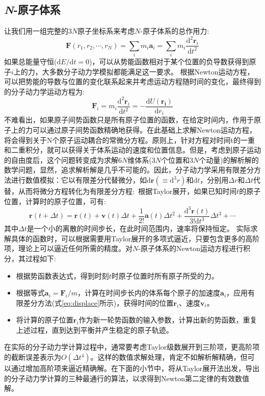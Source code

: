 \subsection{{\it N}-原子体系}
让我们用一组完整的$3N$原子坐标系来考虑$N$-原子体系的总作用力:
\begin{equation}
	\mathbf{F}(r_1,r_2,\cdots,r_N)=\sum_im_i\mathbf{a}_i=\sum_im_i\dfrac{\mathrm{d}^2\mathbf{r}_i}{\mathrm{d}t^2}
	\label{eq:MD_force}
\end{equation}
如果总能量守恒($\mathrm{d}E/\mathrm{d}t=0$)，可以从势能函数相对于某个位置的负导数获得到原子$i$上的力，大多数分子动力学模拟都能满足这一要求。%
根据\textrm{Newton}运动方程，可以把势能的导数与位置的变化联系起来并考虑运动方程随时间的变化，最终得到的分子动力学运动方程为:
\begin{equation}
	\mathbf{F}_i=m_i\dfrac{\mathrm{d}^2\mathbf{r}_i}{\mathrm{d}t^2}=-\dfrac{\mathrm{d}U(\mathbf{r_i})}{\mathrm{d}r_i}
	\label{eq:Forece_Potential}
\end{equation}
不难看出，如果原子间势函数只是所有原子位置的函数，在给定时间内，作用于原子上的力可以通过原子间势函数精确地获得。在此基础上求解\textrm{Newton}运动方程，将会得到关于N个原子运动耦合的常微分方程。原则上，针对方程对时间t的一重和二重积分，就可以获得关于体系运动的速度和位置信息。但是，考虑到原子运动的自由度后，这个问题转变成为求解$6N$维体系($3N$个位置和$3N$个动量)的解析解的数学问题，显然，追求解析解是几乎不可能的。因此，分子动力学采用有限差分方法进行数值模拟：它以有限差分代替微分，如$\mathrm{d}\mathbf{r}(\equiv\mathrm{d}^3r)$和$\mathrm{d}t$，分别用$\Delta r$和$\Delta t$代替，从而将微分方程转化为有限差分方程:~根据\textrm{Taylor}展开，如果已知时间$t$的原子位置，计算时的原子位置，可有:
\begin{equation}
	\mathbf{r}(t+\Delta t)=\mathbf{r}(t)+\mathbf{v}(t)\Delta t+\dfrac1{2!}\mathbf{a}(t)\Delta t^2+\dfrac{\mathrm{d}^3\mathbf{r}(t)}{3!\mathrm{d}t^3}\Delta t^3+\cdots
	\label{eq:displace}
\end{equation}
其中$\Delta t$是一个小的离散的时间步长，在此时间范围内，速率将保持恒定。
实际求解具体的函数时，可以根据需要用\textrm{Taylor}展开的多项式逼近，只要包含更多的高阶项，理论上可以逼近任何所需的精度。对$N$-原子体系的\textrm{Newton}运动方程进行积分，其过程如下:
\begin{itemize}
	\item 根据势函数表达式，得到时刻$t$时原子位置时所有原子所受的力。
	\item 根据等式$\mathbf{a}_i =\mathbf{F}_i/m$，计算在时间步长内的体系每个原子的加速度$\mathbf{a}_i$，应用有限差分方法(式\eqref{eq:displace}所示)，获得时间的位置$\mathbf{r}_i$、速度$\mathbf{v}_i$。
	\item 将计算的原子位置$\mathbf{r}_i$作为新一轮势函数的输入参数，计算出新的势函数，重复上述过程，直到达到平衡并产生稳定的原子轨迹。
\end{itemize}
在实际的分子动力学计算过程中，通常要考虑\textrm{Taylor}级数展开到三阶项，更高阶项的截断误差表示为$O(\Delta t^4)$。这样的数值求解处理，肯定不如解析解精确，但可以通过增加高阶项来逼近精确解。在下面的小节中，将从\textrm{Taylor}展开法出发，导出的分子动力学计算的三种最通行的算法，以求得到\textrm{Newton}第二定律的有效数值解。
